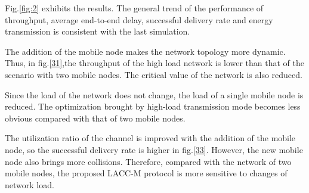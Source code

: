 \documentclass[conference]{IEEEtran}
\begin{document}
Fig.\ref{fig:2} exhibits the results. The general trend of the performance of throughput, average end-to-end delay, successful delivery rate and energy transmission is consistent with the last simulation.

The addition of the mobile node makes the network topology more dynamic. Thus, in fig.\ref{31},the throughput of the high load network is lower than that of the scenario with two mobile nodes. The critical value of the network is also reduced.

Since the load of the network does not change, the load of a single mobile node is reduced. The optimization brought by high-load transmission mode becomes less obvious compared with that of two mobile nodes.

The utilization ratio of the channel is improved with the addition of the mobile node, so the successful delivery rate is higher in fig.\ref{33}. However, the new mobile node also brings more collisions. Therefore, compared with the network of two mobile nodes, the proposed LACC-M protocol is more sensitive to changes of network load.
\end{document}
